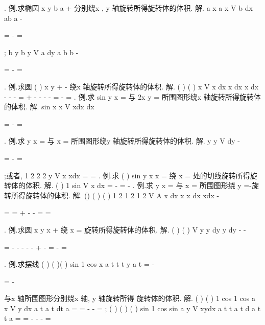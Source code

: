 \int 
. 
\textcolor{lyred}{例}.求椭圆
x
y
b
a +
\le 分别绕x , y 轴旋转所得旋转体的体积. 
解.
a
x
a
x
V
b
dx
ab
a
\pi 
\pi 
-


=
-
=




\int 
;
b
y
b
y
V
a
dy
a b
b
\pi 
\pi 
-


=
-
=




\int 
. 
\textcolor{lyred}{例}.求圆
(
)
x
y
+
-
\le 绕x 轴旋转所得旋转体的体积. 
解.
(
)
(
)
x
V
x
dx
x
dx
x dx
\pi 
\pi 
\pi 
\pi 
-
-
-
=
+
-
-
-
-
=
-
=
\int 
\int 
\int 
. 
\textcolor{lyred}{例}.求
sin
y
x
=
与
2x
y
\pi 
=
所围图形绕x 轴旋转所得旋转体的体积. 
解.
sin
x
x
V
xdx
dx
\pi 
\pi 
\pi 
\pi 
\pi 
\pi 


=
\cdots 
-\cdots 
=




\int 
\int 
. 
\textcolor{lyred}{例}.求
y
x
=
与
x =
所围图形绕y 轴旋转所得旋转体的体积. 
解.
y
y
V
dy
\pi 
\pi 
\pi 
-




=
\cdots -
=








\int 
;或者,
1 2
2 2
y
V
x
xdx
\pi 
\pi 
=
\cdots 
=
\int 
. 
\textcolor{lyred}{例}.求
(
)
sin
y
x
x
\pi 
=
\le 
\le 
绕
x
\pi 
=
处的切线旋转所得旋转体的体积. 
解.
(
)
1 sin
V
x
dx
\pi 
\pi 
\pi 
\pi 
=
-
=
-
\int 
. 
\textcolor{lyred}{例}.求
y
x
=
与
x =
所围图形绕
y =-旋转所得旋转体的体积. 
解.
()
(
)
(
)
1 2
1 2
1 2
V
A x dx
x
x
dx
xdx
\pi 
\pi 
\pi 
\pi 
-


=
=
+
-
-
=
=




\int 
\int 
\int 
. 
\textcolor{lyred}{例}.求圆
x
y
x
+
\le 
绕
x =
旋转所得旋转体的体积. 
解.
(
)
(
)
V
y
y
dy
y dy
\pi 
\pi 
\pi 
-
-




=
-
-
-
-
-
+
-
=
-
=








\int 
\int 
. 
\textcolor{lyred}{例}.求摆线
(
)
(
)(
)
sin
1 cos
x
a t
t
t
y
a
t
\pi 
=
-

\le \le 

=
-

与x 轴所围图形分别绕x 轴, y 轴旋转所得 
旋转体的体积. 
解.
(
)
(
)
1 cos
1 cos
a
x
V
y dx
a
t
a
t dt
a
\pi 
\pi 
\pi 
\pi 
\pi 
=
=
-
\cdots 
-
=
\int 
\int 
; 
(
)
(
)
(
)
sin
1 cos
sin
a
y
V
xydx
a t
t
a
t d a t
t
a
\pi 
\pi 
\pi 
\pi 
\pi 
=
=
-
\cdots 
-
-
=




